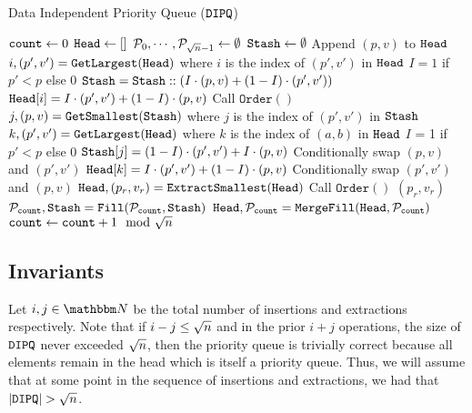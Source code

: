 	
\begin{algorithm}
	\caption{Data Independent Priority Queue ($\texttt{DIPQ}$)}
	\label{alg:DIQueue}
	\begin{algorithmic}[1]
		\Function{$\DIPQInit$}{}
		\State ${\texttt{count}} \gets 0$
		\State $\texttt{Head} \gets []$
		\State $\mathcal{P}_0, \cdots, \mathcal{P}_{{\sqrt{n}}-1} \gets \emptyset$
		\State $\texttt{Stash} \gets \emptyset$
		\EndFunction
		\If{$|\DIPQhead| < \sqrtn$}
			\State Append $(p, v)$ to $\texttt{Head}$
		\Else
			\State $i, (p', v') = \texttt{GetLargest}(\texttt{Head})$ where $i$ is the index of $(p', v')$ in $\texttt{Head}$
			\label{algline:HeadExtract}
			\State $I = 1$ if $p' < p$ else $0$
			\State $\texttt{Stash} = \texttt{Stash} :: \left(I \cdot (p, v) + (1 - I) \cdot (p', v')\right)$
			\State $\texttt{Head}[i] = I \cdot (p', v') + (1 - I) \cdot (p, v)$
		\EndIf
		\State Call $\texttt{Order}()$ \label{algline:PQOrderIns}
		\EndFunction
		\Function{$\DIPQExtract$}{}
		 	\State $j, (p, v) = \texttt{GetSmallest}(\texttt{Stash})$ where $j$ is the index of $(p', v')$ in $\texttt{Stash}$
		 	\State $k, (p', v') = \texttt{GetLargest}(\texttt{Head})$ where $k$ is the index of $(a, b)$ in $\texttt{Head}$
			\State $I$ = 1 if $p' < p$ else 0
			\State $\texttt{Stash}[j] = (1 - I) \cdot (p', v') + I \cdot (p, v)$ \Comment Conditionally swap $(p, v)$ and $(p', v')$
			\State $\texttt{Head}[k] = I \cdot (p', v') + (1 - I) \cdot (p, v)$ \Comment Conditionally swap $(p', v')$ and $(p, v)$
			\State $\texttt{Head}, (p_r, v_r) = \texttt{ExtractSmallest}(\texttt{Head})$
			\State Call $\texttt{Order}()$
			\State \Return $(p_r, v_r)$
		\EndFunction
		\Function{$\DIPQOrder$}{}
			\State $\mathcal{P}_{{\texttt{count}}}, \texttt{Stash} = \texttt{Fill}(\mathcal{P}_{\texttt{count}}, \texttt{Stash})$
			\State $\texttt{Head}, \mathcal{P}_{\texttt{count}} = \texttt{MergeFill}(\texttt{Head}, \mathcal{P}_{\texttt{count}})$
			\State ${\texttt{count}} \gets {\texttt{count}} + 1 \mod {{\sqrt{n}}}$
		\EndFunction
	\end{algorithmic}
\end{algorithm}


\subsection{Invariants}
\label{subsec:invariants}
Let $i, j \in \N$ be the total number of insertions and extractions respectively. Note that if $i - j \leq {\sqrt{n}}$
and in the prior $i + j$ operations, the size of $\texttt{DIPQ}$ never exceeded ${\sqrt{n}}$, then the priority queue is trivially correct because all elements remain in the head which is itself a priority queue.
Thus, we will assume that at some point in the sequence of insertions and extractions, we had that $|\texttt{DIPQ}| > {\sqrt{n}}$.

